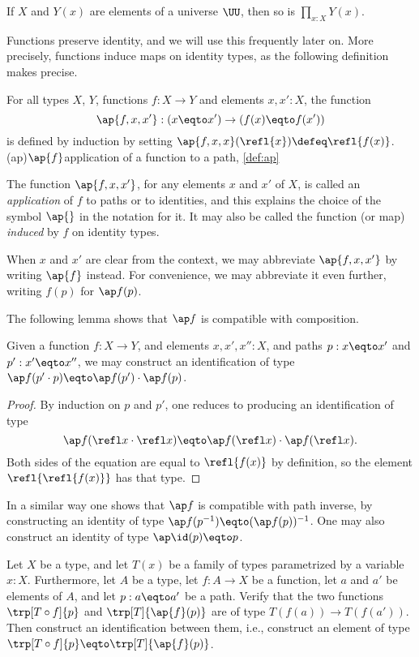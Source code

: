 If $X$ and $Y(x)$ are elements of a universe $\UU$, then so is $\prod_{x:X} Y(x)$.

Functions preserve identity, and we will use this frequently later on.  More precisely, functions induce maps on identity types, as the
following definition makes precise.

\begin{definition}\label{def:ap}
For all types $X$, $Y$, functions $f:X\to Y$ and elements $x,x':X$, the function
$$\ap{f,x,x'} : (x \eqto x') \to (f(x) \eqto f(x'))$$ is defined by induction by setting
$\ap{f,x,x}(\refl{x})\defeq\refl{f(x)}$.%
\glossary(ap){$\protect\ap{f}$}{application of a function to a path, \cref{def:ap}}
\end{definition}

The function $\ap{f,x,x'}$, for any elements $x$ and $x'$ of $X$, is called an \emph{application} of $f$ to paths or to identities,
and this explains the choice of the symbol $\ap{}$ in the notation for it.
It may also be called the function (or map) \emph{induced} by $f$ on identity types.

When $x$ and $x'$ are clear from the context, we may abbreviate $\ap{f,x,x'}$ by writing $\ap{f}$ instead.
For convenience, we may abbreviate it even further, writing $f(p)$ for $\ap f (p)$.

The following lemma shows that $\ap f$ is compatible with composition.

\begin{lemma}\label{lem:apcomp}
  Given a function $f:X\to Y$, and elements $x,x',x'':X$, and paths $p : x \eqto x'$ and $p' : x' \eqto x''$,
  we may construct an identification of type $\ap f (p' \cdot p) \eqto  \ap f (p') \cdot  \ap f (p)$.
\end{lemma}

\begin{proof}
  By induction on $p$ and $p'$, one reduces to producing an identification of type
  \[
    \ap f (\refl x \cdot \refl x) \eqto  \ap f ( \refl x ) \cdot  \ap f ( \refl x ).
  \]
  Both sides of the equation are equal to $\refl { f(x) }$ by definition, so the element $\refl {\refl { f(x) }}$
  has that type.
\end{proof}

In a similar way one shows that $\ap f$ is compatible with path inverse, by constructing an identity of type
$\ap f(p^{-1}) \eqto  (\ap f (p))^{-1}$.   One may also construct an identity of type $\ap \id (p) \eqto p$.


\begin{xca}\label{xca:trp-ap}
  Let $X$ be a type, and let $T(x)$ be a family of types parametrized by a variable $x:X$. Furthermore, let $A$ be a type, let $f:A\to X$ be a
  function, let $a$ and $a'$ be elements of $A$, and let $p: a \eqto a'$ be a path.
  Verify that the two functions $\trp[T \circ f]{p}$ and $\trp[T]{\ap{f}(p)}$ are of type $T(f(a)) \to T(f(a'))$.
  Then construct an identification between them, i.e., construct an element of type $\trp[T \circ f]{p} \eqto \trp[T]{\ap{f}(p)}$.
\end{xca}

